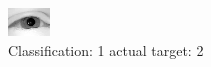 \begin{figure}[h!]
\begin{center}
\includegraphics[width=0.60\columnwidth]{figures/ID2225_class_1_target_2.png}
\end{center}
\caption{ Classification: 1 actual target: 2}
\label{fig:ID2225_class_1_target_2}
\end{figure}
